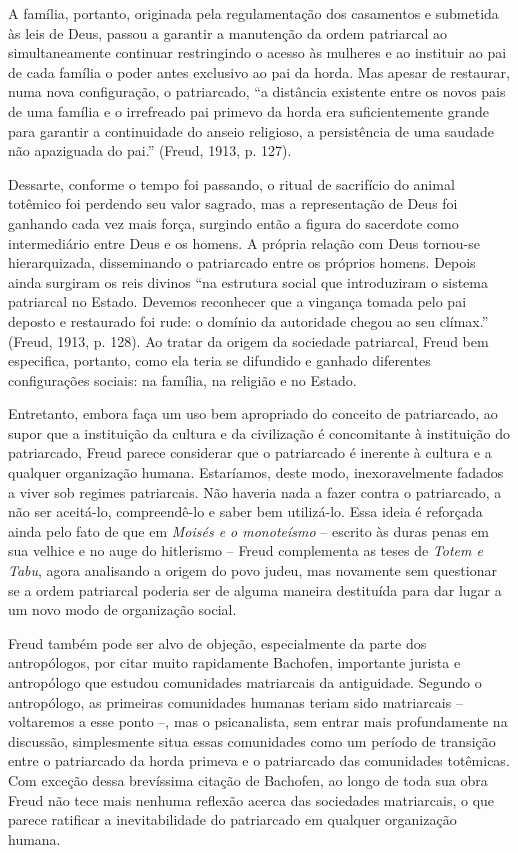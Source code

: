 A família, portanto, originada pela regulamentação dos casamentos e
submetida às leis de Deus, passou a garantir a manutenção da ordem
patriarcal ao simultaneamente continuar restringindo o acesso às
mulheres e ao instituir ao pai de cada família o poder antes exclusivo
ao pai da horda. Mas apesar de restaurar, numa nova configuração, o
patriarcado, ``a distância existente entre os novos pais de uma família
e o irrefreado pai primevo da horda era suficientemente grande para
garantir a continuidade do anseio religioso, a persistência de uma
saudade não apaziguada do pai.'' (Freud, 1913, p. 127).

Dessarte, conforme o tempo foi passando, o ritual de sacrifício do
animal totêmico foi perdendo seu valor sagrado, mas a representação de
Deus foi ganhando cada vez mais força, surgindo então a figura do
sacerdote como intermediário entre Deus e os homens. A própria relação
com Deus tornou-se hierarquizada, disseminando o patriarcado entre os
próprios homens. Depois ainda surgiram os reis divinos ``na estrutura
social que introduziram o sistema patriarcal no Estado. Devemos
reconhecer que a vingança tomada pelo pai deposto e restaurado foi rude:
o domínio da autoridade chegou ao seu clímax.'' (Freud, 1913, p. 128).
Ao tratar da origem da sociedade patriarcal, Freud bem especifica,
portanto, como ela teria se difundido e ganhado diferentes configurações
sociais: na família, na religião e no Estado.

Entretanto, embora faça um uso bem apropriado do conceito de
patriarcado, ao supor que a instituição da cultura e da civilização é
concomitante à instituição do patriarcado, Freud parece considerar que o
patriarcado é inerente à cultura e a qualquer organização humana.
Estaríamos, deste modo, inexoravelmente fadados a viver sob regimes
patriarcais. Não haveria nada a fazer contra o patriarcado, a não ser
aceitá-lo, compreendê-lo e saber bem utilizá-lo. Essa ideia é reforçada
ainda pelo fato de que em \emph{Moisés e o monoteísmo} -- escrito às
duras penas em sua velhice e no auge do hitlerismo -- Freud complementa
as teses de \emph{Totem e Tabu}, agora analisando a origem do povo
judeu, mas novamente sem questionar se a ordem patriarcal poderia ser de
alguma maneira destituída para dar lugar a um novo modo de organização
social.

Freud também pode ser alvo de objeção, especialmente da parte dos
antropólogos, por citar muito rapidamente Bachofen, importante jurista e
antropólogo que estudou comunidades matriarcais da antiguidade. Segundo
o antropólogo, as primeiras comunidades humanas teriam sido matriarcais
-- voltaremos a esse ponto --, mas o psicanalista, sem entrar mais
profundamente na discussão, simplesmente situa essas comunidades como um
período de transição entre o patriarcado da horda primeva e o
patriarcado das comunidades totêmicas. Com exceção dessa brevíssima
citação de Bachofen, ao longo de toda sua obra Freud não tece mais
nenhuma reflexão acerca das sociedades matriarcais, o que parece
ratificar a inevitabilidade do patriarcado em qualquer organização
humana.

